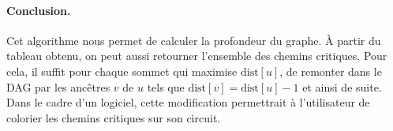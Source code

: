 \paragraph{Conclusion.} Cet algorithme nous permet de calculer la profondeur du graphe. À partir du tableau obtenu, on peut aussi retourner l'ensemble des chemins critiques. Pour cela, il suffit pour chaque sommet qui maximise $\text{dist}[u]$, de remonter dans le DAG par les ancêtres $v$ de $u$ tels que $\text{dist}[v] = \text{dist}[u]-1$ et ainsi de suite. Dans le cadre d'un logiciel, cette modification permettrait à l’utilisateur de colorier les chemins critiques sur son circuit.
